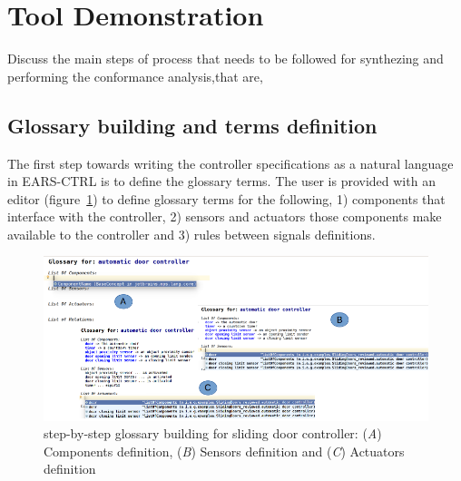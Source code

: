 \section{Tool Demonstration}
\label{sec:demo}
Discuss the main steps of process that needs to be followed for synthezing
and performing the conformance analysis,that are,
\subsection{Glossary building and terms definition}
The first step towards writing the controller specifications as a natural
language in \textsf{EARS-CTRL} is to define the glossary terms. 
The user is provided with an editor
(figure~\ref{fig:glossary_def}) to define glossary terms for the following,
1) components that interface with the controller, 2) sensors and actuators those components make available to the controller and 3) rules between
signals definitions.
\begin{figure}[!h]
\centering
\includegraphics[width=1\textwidth]{./images/glossary_def1.png}
\caption{step-by-step glossary building for sliding door controller: (\emph{A})
Components definition, (\emph{B}) Sensors definition and (\emph{C}) Actuators
definition}
\label{fig:glossary_def}
\end{figure}
